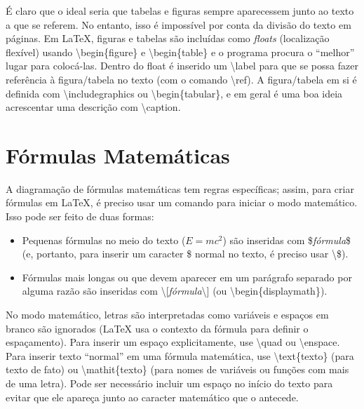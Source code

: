 É claro que o ideal seria que tabelas e figuras sempre aparecessem junto ao
texto a que se referem. No entanto, isso é impossível por conta da divisão
do texto em páginas. Em \LaTeX{}, figuras e tabelas são incluídas como
\emph{floats} (localização flexível) usando \textsf{\textbackslash{}begin\{figure\}}
e \textsf{\textbackslash{}begin\{table\}} e o programa procura o ``melhor''
lugar para colocá-las. Dentro do float é inserido um
\textsf{\textbackslash{}label} para que se possa fazer referência à figura/tabela
no texto (com o comando \textsf{\textbackslash{}ref}). A figura/tabela em
si é definida com \textsf{\textbackslash{}includegraphics} ou
\textsf{\textbackslash{}begin\{tabular\}}, e em geral é uma boa ideia acrescentar
uma descrição com \textsf{\textbackslash{}caption}.

\section{Fórmulas Matemáticas}

A diagramação de fórmulas matemáticas tem regras específicas; assim, para
criar fórmulas em \LaTeX{}, é preciso usar um comando para iniciar o modo
matemático. Isso pode ser feito de duas formas:

\begin{itemize}
  \item Pequenas fórmulas no meio do texto ($E=mc^2$) são inseridas com
  \$\textsf{\textit{fórmula}}\$ (e, portanto, para inserir um caracter \$
  normal no texto, é preciso usar \textbackslash{}\$).

  \item Fórmulas mais longas ou que devem aparecer em um parágrafo
  separado por alguma razão são inseridas com
  \textbackslash{}[\textsf{\textit{fórmula}}\textbackslash{}] (ou
  \textsf{\textbackslash{}begin\{displaymath\}}).
\end{itemize}

No modo matemático, letras são interpretadas como variáveis e espaços
em branco são ignorados (\LaTeX{} usa o contexto da fórmula para
definir o espaçamento). Para inserir um espaço explicitamente, use
\textsf{\textbackslash{}quad} ou \textsf{\textbackslash{}enspace}.
Para inserir texto ``normal'' em uma fórmula matemática, use
\textsf{\textbackslash{}text\{texto\}} (para texto de fato) ou
\textsf{\textbackslash{}mathit\{texto\}} (para nomes de variáveis
ou funções com mais de uma letra). Pode ser necessário incluir um
espaço no início do texto para evitar que ele apareça junto ao
caracter matemático que o antecede.

